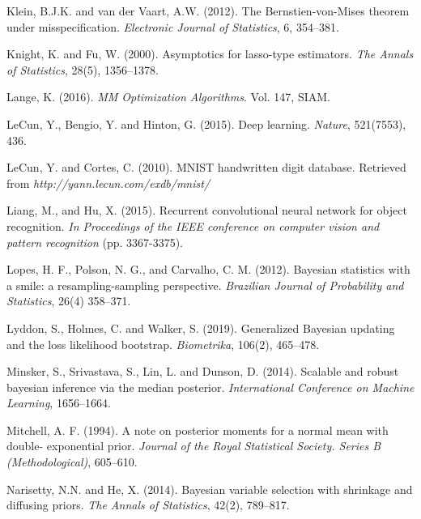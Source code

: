 \documentclass[12pt]{TD-CJS}
\begin{document}
\begin{thebibliography}{}
\bibitem[Klein2012]
Klein, B.J.K. and van der Vaart, A.W. (2012). The Bernstien-von-Mises theorem
under misspecification. {\em Electronic Journal of Statistics}, 6, 354--381.

Knight, K. and  Fu, W. (2000). Asymptotics for lasso-type estimators.
 {\em The Annals of Statistics}, 28(5), 1356--1378.

Lange, K. (2016). {\em MM Optimization Algorithms}. Vol. 147, SIAM. 

LeCun, Y., Bengio, Y. and Hinton, G. (2015). Deep learning. {\it Nature}, 521(7553), 436.

LeCun, Y. and Cortes, C. (2010). MNIST handwritten digit database. Retrieved from {\it http://yann.lecun.com/exdb/mnist/}

Liang, M., and Hu, X. (2015). Recurrent convolutional neural network for object recognition. {\it In Proceedings of the IEEE conference on computer vision and pattern recognition} (pp. 3367-3375).

Lopes, H. F., Polson, N. G., and  Carvalho, C. M. (2012). Bayesian statistics with a smile: a resampling-sampling perspective. {\it Brazilian Journal of Probability and Statistics}, 26(4) 358--371.

Lyddon, S., Holmes, C. and Walker, S. (2019). 
Generalized Bayesian updating and the loss likelihood bootstrap. {\em Biometrika}, 106(2), 465--478.


Minsker, S., Srivastava, S.,  Lin, L. and Dunson, D. (2014). Scalable and robust bayesian inference via the median posterior. {\it International Conference on Machine Learning}, 1656--1664.

Mitchell, A. F. (1994). A note on posterior moments for a normal mean with double- exponential prior. {\it Journal of the Royal Statistical Society. Series B (Methodological)}, 605--610.

Narisetty, N.N. and  He, X. (2014). Bayesian variable selection with shrinkage and
diffusing priors. {\it The Annals of Statistics}, 42(2), 789--817.

%


\end{thebibliography}
\end{document}
